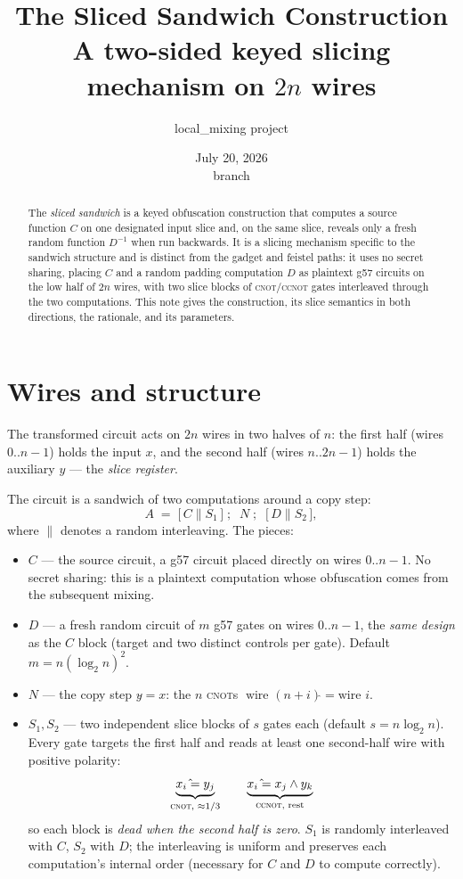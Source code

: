 \documentclass[11pt]{article}
\title{\textbf{The Sliced Sandwich Construction}\\[2pt]
\large A two-sided keyed slicing mechanism on $2n$ wires}
\author{local\_mixing project}
\date{July 20, 2026 \\ \small branch \code{ssg-gen-mix-clean}}
\newcommand{\CNOT}{\textsc{cnot}}
\newcommand{\CCNOT}{\textsc{ccnot}}
\begin{document}
\maketitle

\begin{abstract}
\noindent The \emph{sliced sandwich} is a keyed obfuscation construction that
computes a source function $C$ on one designated input slice and, on the same
slice, reveals only a fresh random function $D^{-1}$ when run backwards. It is
a slicing mechanism specific to the sandwich structure and is distinct from
the gadget and feistel paths: it uses no secret sharing, placing $C$ and a
random padding computation $D$ as plaintext g57 circuits on the low half of
$2n$ wires, with two slice blocks of \CNOT/\CCNOT{} gates interleaved through
the two computations. This note gives the construction, its slice semantics
in both directions, the rationale, and its parameters.
\end{abstract}

\section{Wires and structure}

The transformed circuit acts on $2n$ wires in two halves of $n$:
the first half (wires $0..n{-}1$) holds the input $x$, and the second half
(wires $n..2n{-}1$) holds the auxiliary $y$ --- the \emph{slice register}.

The circuit is a sandwich of two computations around a copy step:
\[
A \;=\; \bigl[\, C \parallel S_1 \,\bigr]\;;\;\; N \;;\;\; \bigl[\, D \parallel S_2 \,\bigr],
\]
where $\parallel$ denotes a random interleaving. The pieces:

\begin{itemize}
\item \textbf{$C$} --- the source circuit, a g57 circuit placed directly on
wires $0..n{-}1$. No secret sharing: this is a plaintext computation whose
obfuscation comes from the subsequent mixing.
\item \textbf{$D$} --- a fresh random circuit of $m$ g57 gates on wires
$0..n{-}1$, the \emph{same design} as the $C$ block (target and two distinct
controls per gate). Default $m = n(\log_2 n)^2$.
\item \textbf{$N$} --- the copy step $y \mathrel{\hat{}}= x$: the $n$ \CNOT{}s
$\;\text{wire } (n{+}i) \mathrel{\hat{}}= \text{wire } i$.
\item \textbf{$S_1, S_2$} --- two independent slice blocks of $s$ gates each
(default $s = n\log_2 n$). Every gate targets the first half and reads at
least one second-half wire with positive polarity:
\[
\underbrace{x_i \mathrel{\hat{}}= y_j}_{\text{\CNOT, }\approx 1/3}
\qquad
\underbrace{x_i \mathrel{\hat{}}= x_j \wedge y_k}_{\text{\CCNOT, rest}}
\]
so each block is \emph{dead when the second half is zero}. $S_1$ is randomly
interleaved with $C$, $S_2$ with $D$; the interleaving is uniform and
preserves each computation's internal order (necessary for $C$ and $D$ to
compute correctly).
\end{itemize}
\end{document}
